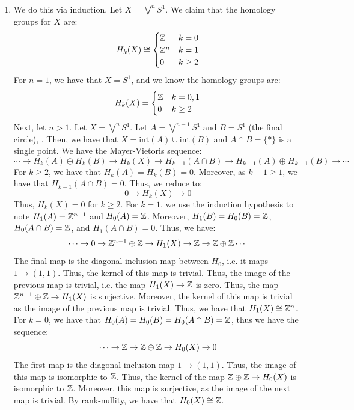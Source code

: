 \documentclass[12pt]{article}
\begin{document}
\begin{solution}
    \bbni
    \begin{enumerate}
        \item We do this via induction. Let $X = \bigvee^n S^1$. We claim that the homology groups for $X$ are: 
        \[ H_k(X) \cong \begin{cases} \mathbb Z & k = 0 \\ \mathbb Z^n & k = 1 \\ 0 & k \geq 2 \end{cases} \]
        For $n = 1$, we have that $X = S^1$, and we know the homology groups are:
        \[ H_k(X) = \begin{cases} \mathbb Z & k = 0, 1 \\ 0 & k \geq 2 \end{cases} \]
        Next, let $n > 1$. Let $X= \bigvee^n S^1$. Let $A = \bigvee^{n-1} S^1$ and $B = S^1$ (the final circle), . Then, we have that $X = \text{int}(A) \cup \text{int}(B)$ and $A \cap B = \{*\}$ is a single point. We have the Mayer-Vietoris sequence:
        \[ \cdots \to H_k(A) \oplus H_k(B) \to H_k(X) \to H_{k-1}(A \cap B) \to H_{k-1}(A) \oplus H_{k-1}(B) \to \cdots\]
        For $k \geq 2$, we have that $H_k(A) = H_k(B) = 0$. Moreover, as $k-1 \geq 1$, we have that $H_{k-1}(A \cap B) = 0$. Thus, we reduce to:
        \[ 0 \to H_k(X) \to 0 \]
        Thus, $H_k(X) = 0$ for $k \geq 2$. \bbni
        For $k = 1$, we use the induction hypothesis to note $H_1(A) = \mathbb Z^{n-1}$ and $H_0(A) = \mathbb Z$. Moreover, $H_1(B) = H_0(B) = \mathbb Z$, $H_0(A \cap B) = \mathbb Z$, and $H_1(A \cap B) = 0$. Thus, we have: 
        \[ \cdots \to 0 \to \mathbb Z^{n-1} \oplus \mathbb Z \to H_1(X) \to \mathbb Z \to \mathbb Z \oplus \mathbb Z \cdots\]
        The final map is the diagonal inclusion map between $H_0$, i.e. it maps $1 \to (1, 1)$. Thus, the kernel of this map is trivial. Thus, the image of the previous map is trivial, i.e. the map $H_1(X) \to \mathbb Z$ is zero. Thus, the map $\mathbb Z^{n-1} \oplus \mathbb Z \to H_1(X)$ is surjective. Moreover, the kernel of this map is trivial as the image of the previous map is trivial. Thus, we have that $H_1(X) \cong \mathbb Z^n$. \bbni
        For $k = 0$, we have that $H_0(A) = H_0(B) = H_0(A\cap B) = \mathbb Z$, thus we have the sequence:  
        \[ \cdots \to \mathbb Z \to \mathbb Z \oplus \mathbb Z \to H_0(X) \to 0\]
        The first map is the diagonal inclusion map $1 \to (1, 1)$. Thus, the image of this map is isomorphic to $\mathbb Z$. Thus, the kernel of the map $\mathbb Z \oplus \mathbb Z \to H_0(X)$ is isomorphic to $\mathbb Z$. Moreover, this map is surjective, as the image of the next map is trivial. By rank-nullity, we have that $H_0(X) \cong \mathbb Z$. \bbni

\end{enumerate}
\end{solution}
\end{document}
